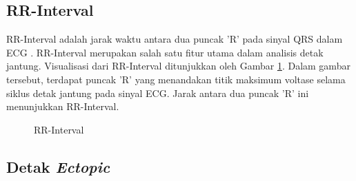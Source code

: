 \subsection{RR-Interval}
\label{subsec: landasan-rri}

RR-Interval adalah jarak waktu antara dua puncak 'R' pada sinyal QRS dalam ECG \parencite{lanfranchiChapter20Cardiovascular2011}.
RR-Interval merupakan salah satu fitur utama dalam analisis detak jantung.
Visualisasi dari RR-Interval ditunjukkan oleh Gambar \ref{fig:rri}.
Dalam gambar tersebut, terdapat puncak 'R' yang menandakan titik maksimum voltase selama siklus detak jantung pada sinyal ECG.
Jarak antara dua puncak 'R' ini menunjukkan RR-Interval.
\begin{figure}[H]
  \centering
  \caption{RR-Interval}
  \label{fig:rri}
\end{figure}

\subsection{Detak \textit{Ectopic}}
\label{subsec: landasan-ectopic}

%


